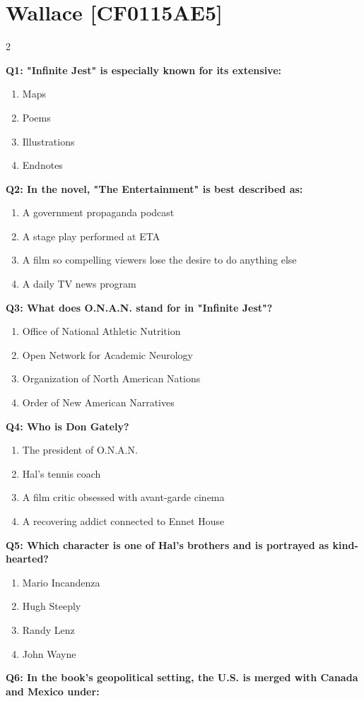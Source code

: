 \documentclass[10pt]{article}
\begin{document}
\section*{Wallace \footnotesize [CF0115AE5]}
\begin{multicols}{2}

\textbf{Q1: "Infinite Jest" is especially known for its extensive:}

\begin{enumerate}[label=\arabic*.]
\item Maps
\item Poems
\item Illustrations
\item Endnotes
\end{enumerate}
\textbf{Q2: In the novel, "The Entertainment" is best described as:}

\begin{enumerate}[label=\arabic*.]
\item A government propaganda podcast
\item A stage play performed at ETA
\item A film so compelling viewers lose the desire to do anything else
\item A daily TV news program
\end{enumerate}
\textbf{Q3: What does O.N.A.N. stand for in "Infinite Jest"?}

\begin{enumerate}[label=\arabic*.]
\item Office of National Athletic Nutrition
\item Open Network for Academic Neurology
\item Organization of North American Nations
\item Order of New American Narratives
\end{enumerate}
\textbf{Q4: Who is Don Gately?}

\begin{enumerate}[label=\arabic*.]
\item The president of O.N.A.N.
\item Hal's tennis coach
\item A film critic obsessed with avant-garde cinema
\item A recovering addict connected to Ennet House
\end{enumerate}
\textbf{Q5: Which character is one of Hal's brothers and is portrayed as kind-hearted?}

\begin{enumerate}[label=\arabic*.]
\item Mario Incandenza
\item Hugh Steeply
\item Randy Lenz
\item John Wayne
\end{enumerate}
\textbf{Q6: In the book's geopolitical setting, the U.S. is merged with Canada and Mexico under:}


\end{multicols}
\end{document}
